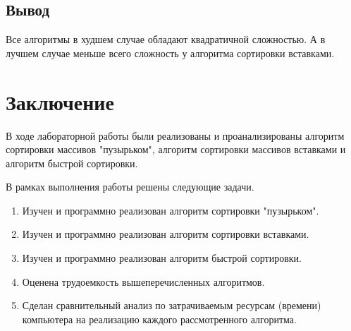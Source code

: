\documentclass[12pt]{report}
\begin{document}
\section{Вывод}

Все алгоритмы в худшем случае обладают квадратичной сложностью.
А в лучшем случае меньше всего сложность у алгоритма сортировки
вставками.


\chapter*{Заключение}
В ходе лабораторной работы были реализованы и проанализированы алгоритм сортировки массивов "пузырьком", алгоритм сортировки массивов вставками и алгоритм быстрой сортировки. 

В рамках выполнения работы решены следующие задачи.

\begin{enumerate}
\item Изучен и программно реализован алгоритм сортировки "пузырьком".
\item Изучен и программно реализован алгоритм сортировки вставками.
\item Изучен и программно реализован алгоритм быстрой сортировки.
\item Оценена трудоемкость вышеперечисленных алгоритмов.
\item Сделан сравнительный анализ по затрачиваемым ресурсам (времени) компьютера на реализацию каждого рассмотренного алгоритма.
\end{enumerate}



\end{document}
